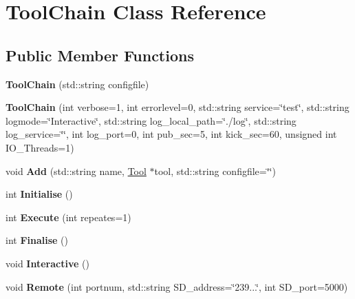 \hypertarget{classToolChain}{\section{Tool\-Chain Class Reference}
\label{classToolChain}
}
\subsection*{Public Member Functions}
\begin{DoxyCompactItemize}
\item 
\hypertarget{classToolChain_a75af494cf7d613290c48fcbcdb700482}{{\bfseries Tool\-Chain} (std\-::string configfile)}\label{classToolChain_a75af494cf7d613290c48fcbcdb700482}

\item 
\hypertarget{classToolChain_a82c1596d9d6e233492e29ac83e2f8952}{{\bfseries Tool\-Chain} (int verbose=1, int errorlevel=0, std\-::string service=\char`\"{}test\char`\"{}, std\-::string logmode=\char`\"{}Interactive\char`\"{}, std\-::string log\-\_\-local\-\_\-path=\char`\"{}./log\char`\"{}, std\-::string log\-\_\-service=\char`\"{}\char`\"{}, int log\-\_\-port=0, int pub\-\_\-sec=5, int kick\-\_\-sec=60, unsigned int I\-O\-\_\-\-Threads=1)}\label{classToolChain_a82c1596d9d6e233492e29ac83e2f8952}

\item 
\hypertarget{classToolChain_a4da0c02154a0597704e58836d6607e61}{void {\bfseries Add} (std\-::string name, \hyperlink{classTool}{Tool} $\ast$tool, std\-::string configfile=\char`\"{}\char`\"{})}\label{classToolChain_a4da0c02154a0597704e58836d6607e61}

\item 
\hypertarget{classToolChain_a341f343926341b82a29c586a7b9683af}{int {\bfseries Initialise} ()}\label{classToolChain_a341f343926341b82a29c586a7b9683af}

\item 
\hypertarget{classToolChain_a303e299293fd4d3a5e91865e04898e52}{int {\bfseries Execute} (int repeates=1)}\label{classToolChain_a303e299293fd4d3a5e91865e04898e52}

\item 
\hypertarget{classToolChain_a3828756135773fb9ca4b361a47296dd9}{int {\bfseries Finalise} ()}\label{classToolChain_a3828756135773fb9ca4b361a47296dd9}

\item 
\hypertarget{classToolChain_a9bb47b83b6b85c3b0fab75af0cda19bf}{void {\bfseries Interactive} ()}\label{classToolChain_a9bb47b83b6b85c3b0fab75af0cda19bf}

\item 
\hypertarget{classToolChain_aacc213c07f81ee202dce14856a076df3}{void {\bfseries Remote} (int portnum, std\-::string S\-D\-\_\-address=\char`\"{}239...\char`\"{}, int S\-D\-\_\-port=5000)}\label{classToolChain_aacc213c07f81ee202dce14856a076df3}

\end{DoxyCompactItemize}
